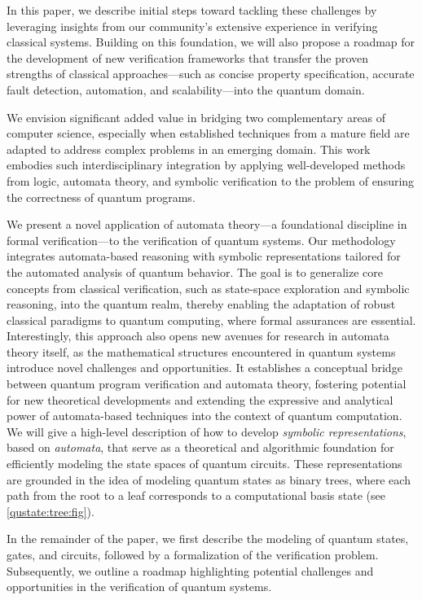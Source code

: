 In this paper, we describe initial steps toward tackling these challenges by leveraging insights from our community's extensive experience in verifying classical systems. 
%
Building on this foundation, we will also propose a roadmap for the development of new verification frameworks that transfer the proven strengths of classical approaches—such as concise property specification, accurate fault detection, automation, and scalability—into the quantum domain.

We envision significant added value in bridging two complementary areas of computer science, especially when established techniques from a mature field are adapted to address complex problems in an emerging domain.
%
This work embodies such interdisciplinary integration by applying well-developed methods from logic, automata theory, and symbolic verification to the problem of ensuring the correctness of quantum programs.
%
 
We present a novel application of automata theory—a foundational discipline in formal verification—to the verification of quantum systems.
%
Our methodology integrates automata-based reasoning with symbolic representations tailored for the automated analysis of quantum behavior.
%
The goal is to generalize core concepts from classical verification, such as state-space exploration and symbolic reasoning, into the quantum realm, thereby enabling the adaptation of robust classical paradigms to quantum computing, where formal assurances are essential.
%
Interestingly, this approach also opens new avenues for research in automata theory itself, as the mathematical structures encountered in quantum systems introduce novel challenges and opportunities.
%
It establishes a conceptual bridge between quantum program verification and automata theory, fostering potential for new theoretical developments and extending the expressive and analytical power of automata-based techniques into the context of quantum computation.
%
We will give a high-level description  of how to  develop {\it symbolic representations}, based on {\it automata}, that serve as a theoretical and algorithmic foundation for efficiently modeling the state spaces of quantum circuits. These representations are grounded in the idea of modeling quantum states as binary trees, where each path from the root to a leaf corresponds to a computational basis state (see \cref{qustate:tree:fig}). 

In the remainder of the paper, we first describe the modeling of quantum states, gates, and circuits, followed by a formalization of the verification problem.
Subsequently, we outline a roadmap highlighting potential challenges and opportunities in the verification of quantum systems.
